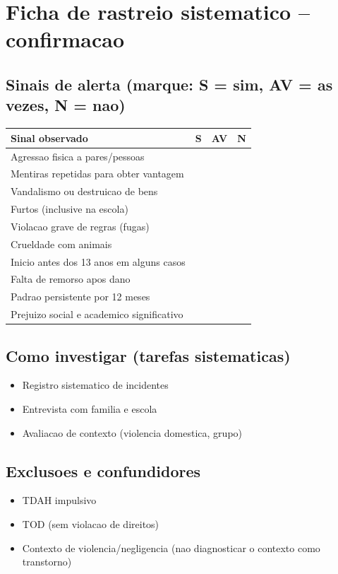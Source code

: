 \documentclass[a4paper,11pt]{book}
\begin{document}
\section*{Ficha de rastreio sistematico -- confirmacao}
\subsection*{Sinais de alerta (marque: S = sim, AV = as vezes, N = nao)}
\begin{tabular}{@{}p{11.5cm}ccc@{}}\toprule
Sinal observado & S & AV & N \\\midrule
Agressao fisica a pares/pessoas & & & \\
Mentiras repetidas para obter vantagem & & & \\
Vandalismo ou destruicao de bens & & & \\
Furtos (inclusive na escola) & & & \\
Violacao grave de regras (fugas) & & & \\
Crueldade com animais & & & \\
Inicio antes dos 13 anos em alguns casos & & & \\
Falta de remorso apos dano & & & \\
Padrao persistente por 12 meses & & & \\
Prejuizo social e academico significativo & & & \\
\bottomrule\end{tabular}
\subsection*{Como investigar (tarefas sistematicas)}
\begin{itemize}
\item Registro sistematico de incidentes
\item Entrevista com familia e escola
\item Avaliacao de contexto (violencia domestica, grupo)
\end{itemize}
\subsection*{Exclusoes e confundidores}
\begin{itemize}
\item TDAH impulsivo
\item TOD (sem violacao de direitos)
\item Contexto de violencia/negligencia (nao diagnosticar o contexto como transtorno)
\end{itemize}
\end{document}
